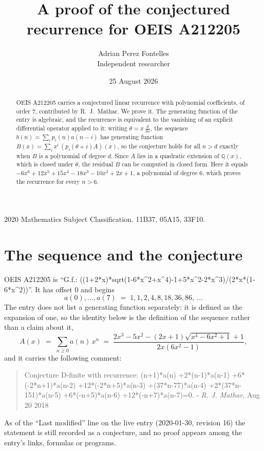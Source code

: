 \documentclass[11pt,a4paper]{article}
\title{A proof of the conjectured recurrence for OEIS A212205}
\author{Adrian Perez Fontelles\\ \small Independent researcher}
\date{25 August 2026}
\theoremstyle{plain}
\theoremstyle{definition}
\begin{document}
\maketitle

\begin{abstract}
OEIS A212205 carries a conjectured linear recurrence with polynomial coefficients, of
order 7, contributed by R.~J.~Mathar. We prove it. The generating function of the
entry is algebraic, and the recurrence is equivalent to the vanishing of an explicit
differential operator applied to it: writing $\theta=x\,\frac{d}{dx}$, the sequence
$b(n)=\sum_{i}p_{i}(n)a(n-i)$ has generating function
$B(x)=\sum_{i}x^{i}\,(p_{i}(\theta+i)A)(x)$, so the conjecture holds for all $n>d$ exactly
when $B$ is a polynomial of degree $d$. Since $A$ lies in a quadratic extension of
$\mathbb{Q}(x)$, which is closed under $\theta$, the residual $B$ can be computed in
closed form. Here it equals $- 6 x^{6} + 12 x^{5} + 15 x^{4} - 18 x^{3} - 10 x^{2} + 2 x + 1$, a polynomial of degree $6$, which proves
the recurrence for every $n>6$.
\end{abstract}

\noindent\small 2020 Mathematics Subject Classification. 11B37, 05A15, 33F10.\normalsize

\section{The sequence and the conjecture}

OEIS A212205 is ``G.f.: ((1+2*x)*sqrt(1-6*x\^{}2+x\^{}4)-1+5*x\^{}2-2*x\^{}3)/(2*x*(1-6*x\^{}2))''. It has offset $0$ and begins
\[
a(0),\dots,a(7)\;=\;1, 1, 2, 4, 8, 18, 36, 86,\ \dots
\]
The entry does not list a generating function separately: it is defined as the
expansion of one, so the identity below is the definition of the sequence rather than a
claim about it,
\begin{equation}\label{eq:gf}
A(x)\;=\;\sum_{n\ge 0} a(n)\,x^{n}\;=\;\frac{2 x^{3} - 5 x^{2} - \left(2 x + 1\right) \sqrt{x^{4} - 6 x^{2} + 1} + 1}{2 x \left(6 x^{2} - 1\right)} ,
\end{equation}
and it carries the following comment:
\begin{quote}\small
Conjecture D-finite with recurrence: (n+1)*a(n) +2*(n-1)*a(n-1) +6*(-2*n+1)*a(n-2) +12*(-2*n+5)*a(n-3) +(37*n-77)*a(n-4) +2*(37*n-151)*a(n-5) +6*(-n+5)*a(n-6) +12*(-n+7)*a(n-7)=0. - \emph{R. J. Mathar}, Aug 20 2018
\end{quote}
As of the ``Last modified'' line on the live entry (2020-01-30, revision 16) the
statement is still recorded as a conjecture, and no proof appears among the entry's links,
formulas or programs.
\end{document}
